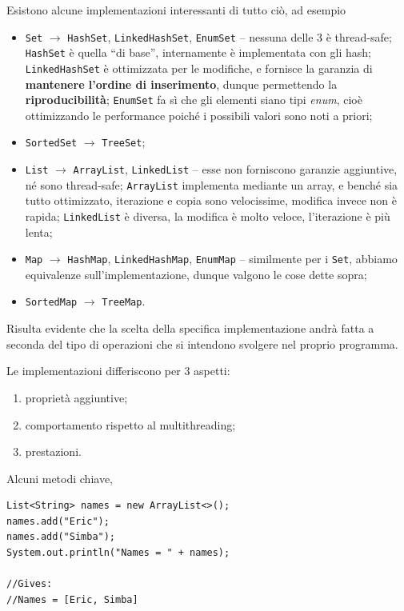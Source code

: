 \documentclass[\fontsizeclass,twocolumn]{\classname}
\theoremstyle{definition}
\theoremstyle{definition}
\begin{document}
Esistono alcune implementazioni interessanti di tutto ciò, ad esempio
\begin{itemize}
    \item \texttt{Set} $\rightarrow$ \texttt{HashSet}, \texttt{LinkedHashSet}, \texttt{EnumSet} -- nessuna delle 3
        è thread\--safe; \texttt{HashSet} è quella ``di base'', internamente è
        implementata con gli hash; \texttt{LinkedHashSet} è ottimizzata per le
        modifiche, e fornisce la garanzia di \textbf{mantenere l'ordine di
        inserimento}, dunque permettendo la \textbf{riproducibilità};
        \texttt{EnumSet} fa sì che gli elementi siano tipi \emph{enum}, cioè
        ottimizzando le performance poiché i possibili valori sono noti a
        priori;
    \item \texttt{SortedSet} $\rightarrow$ \texttt{TreeSet};
    \item \texttt{List} $\rightarrow$ \texttt{ArrayList}, \texttt{LinkedList} -- esse non forniscono
        garanzie aggiuntive, né sono thread\--safe; \texttt{ArrayList}
        implementa mediante un array, e benché sia tutto ottimizzato,
        iterazione e copia sono velocissime, modifica invece non è rapida;
        \texttt{LinkedList} è diversa, la modifica è molto veloce, l'iterazione
        è più lenta;
    \item \texttt{Map} $\rightarrow$ \texttt{HashMap}, \texttt{LinkedHashMap}, \texttt{EnumMap} -- similmente per i
        \texttt{Set}, abbiamo equivalenze sull'implementazione, dunque valgono
        le cose dette sopra;
    \item \texttt{SortedMap} $\rightarrow$ \texttt{TreeMap}.
\end{itemize}

Risulta evidente che la scelta della specifica implementazione andrà fatta a seconda del tipo di operazioni che si intendono svolgere nel proprio programma.

Le implementazioni differiscono per 3 aspetti:
\begin{enumerate}
    \item proprietà aggiuntive;
    \item comportamento rispetto al multithreading;
    \item prestazioni.
\end{enumerate}


Alcuni metodi chiave,

\begin{lstlisting}
List<String> names = new ArrayList<>();
names.add("Eric");
names.add("Simba");
System.out.println("Names = " + names);

//Gives:
//Names = [Eric, Simba]
\end{lstlisting}
\end{document}
